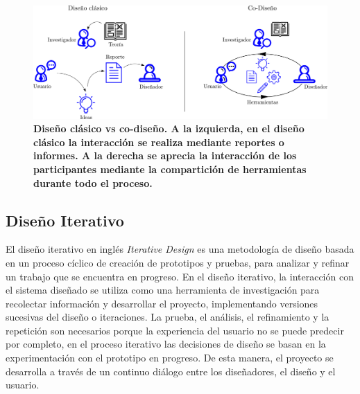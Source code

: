 \begin{figure}
\centering
\includegraphics[width=14cm]{Img/CPD/1-co.png}
\caption{\textbf{\footnotesize{Diseño clásico vs co-diseño. A la izquierda, en el diseño clásico la interacción se realiza mediante reportes o informes. A la derecha se aprecia la interacción de los participantes mediante la compartición de herramientas durante todo el proceso.}}}
\label{fig: co}
\end{figure}


\subsection{Diseño Iterativo}

El diseño iterativo en inglés \textit{Iterative Design} es una metodología de diseño basada en un proceso cíclico de creación de prototipos y pruebas, para analizar y refinar un trabajo que se encuentra en progreso. En el diseño iterativo, la interacción con el sistema diseñado se utiliza como una herramienta de investigación para recolectar información y desarrollar el proyecto, implementando versiones sucesivas del diseño o iteraciones.
La prueba, el análisis, el refinamiento y la repetición son necesarios porque la experiencia del usuario no se puede predecir por completo, en el proceso iterativo las decisiones de diseño se basan en la experimentación  con el prototipo en progreso. De esta manera, el proyecto se desarrolla a través de un continuo diálogo entre los diseñadores, el diseño y el usuario. \citep{Zimmerman2003}

